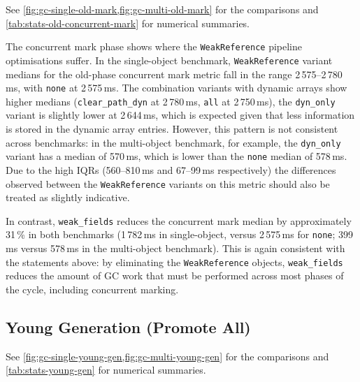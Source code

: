 See \cref{fig:gc-single-old-mark,fig:gc-multi-old-mark} for the comparisons and \cref{tab:stats-old-concurrent-mark} for numerical summaries.

The concurrent mark phase shows where the \texttt{WeakReference} pipeline optimisations suffer. In the single-object benchmark, \texttt{WeakReference} variant medians for the old-phase concurrent mark metric fall in the range 2\,575--2\,780\,ms, with \texttt{none} at 2\,575\,ms. The combination variants with dynamic arrays show higher medians (\texttt{clear\_path\_dyn} at 2\,780\,ms, \texttt{all} at 2\,750\,ms), the \texttt{dyn\_only} variant is slightly lower at 2\,644\,ms, which is expected given that less information is stored in the dynamic array entries. However, this pattern is not consistent across benchmarks: in the multi-object benchmark, for example, the \texttt{dyn\_only} variant has a median of 570\,ms, which is lower than the \texttt{none} median of 578\,ms. Due to the high \acp{IQR} (560--810\,ms and 67--99\,ms respectively) the differences observed between the \texttt{WeakReference} variants on this metric should also be treated as slightly indicative.

In contrast, \texttt{weak\_fields} reduces the concurrent mark median by approximately 31\,\% in both benchmarks (1\,782\,ms in single-object, versus 2\,575\,ms for \texttt{none}; 399\,ms versus 578\,ms in the multi-object benchmark). This is again consistent with the statements above: by eliminating the \texttt{WeakReference} objects, \texttt{weak\_fields} reduces the amount of \ac{GC} work that must be performed across most phases of the cycle, including concurrent marking.

\subsection{Young Generation (Promote All)}
\label{subsec:analysis-overall-younggen}

See \cref{fig:gc-single-young-gen,fig:gc-multi-young-gen} for the comparisons and \cref{tab:stats-young-gen} for numerical summaries.

